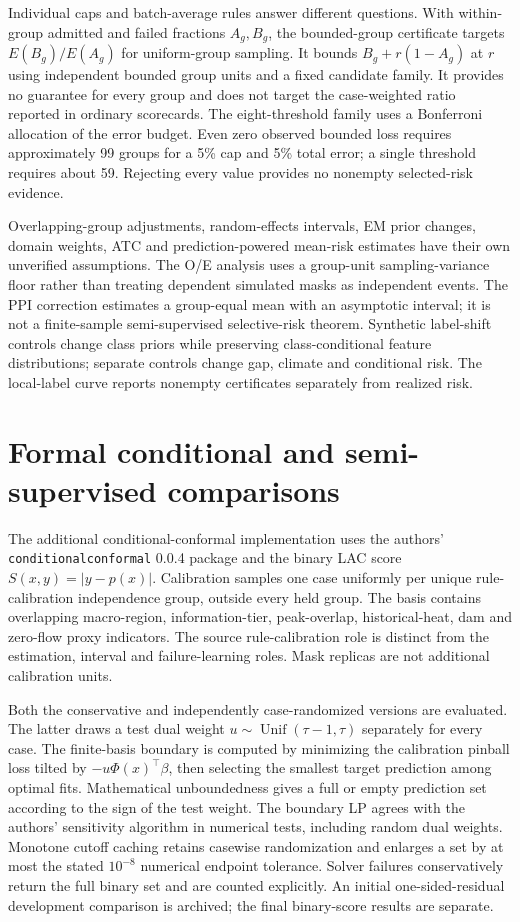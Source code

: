 \documentclass[draft]{agujournal2025}
\begin{document}
Individual caps and batch-average rules answer different questions. With within-group admitted and failed fractions $A_g,B_g$, the bounded-group certificate targets $E(B_g)/E(A_g)$ for uniform-group sampling. It bounds $B_g+r(1-A_g)$ at $r$ using independent bounded group units and a fixed candidate family. It provides no guarantee for every group and does not target the case-weighted ratio reported in ordinary scorecards. The eight-threshold family uses a Bonferroni allocation of the error budget. Even zero observed bounded loss requires approximately 99 groups for a 5\% cap and 5\% total error; a single threshold requires about 59. Rejecting every value provides no nonempty selected-risk evidence.

Overlapping-group adjustments, random-effects intervals, EM prior changes, domain weights, ATC and prediction-powered mean-risk estimates have their own unverified assumptions. The O/E analysis uses a group-unit sampling-variance floor rather than treating dependent simulated masks as independent events. The PPI correction estimates a group-equal mean with an asymptotic interval; it is not a finite-sample semi-supervised selective-risk theorem. Synthetic label-shift controls change class priors while preserving class-conditional feature distributions; separate controls change gap, climate and conditional risk. The local-label curve reports nonempty certificates separately from realized risk.

\section{Formal conditional and semi-supervised comparisons}
The additional conditional-conformal implementation uses the authors' \texttt{conditionalconformal} 0.0.4 package and the binary LAC score $S(x,y)=|y-p(x)|$. Calibration samples one case uniformly per unique rule-calibration independence group, outside every held group. The basis contains overlapping macro-region, information-tier, peak-overlap, historical-heat, dam and zero-flow proxy indicators. The source rule-calibration role is distinct from the estimation, interval and failure-learning roles. Mask replicas are not additional calibration units.

Both the conservative and independently case-randomized versions are evaluated. The latter draws a test dual weight $u\sim\operatorname{Unif}(\tau-1,\tau)$ separately for every case. The finite-basis boundary is computed by minimizing the calibration pinball loss tilted by $-u\Phi(x)^\top\beta$, then selecting the smallest target prediction among optimal fits. Mathematical unboundedness gives a full or empty prediction set according to the sign of the test weight. The boundary LP agrees with the authors' sensitivity algorithm in numerical tests, including random dual weights. Monotone cutoff caching retains casewise randomization and enlarges a set by at most the stated $10^{-8}$ numerical endpoint tolerance. Solver failures conservatively return the full binary set and are counted explicitly. An initial one-sided-residual development comparison is archived; the final binary-score results are separate.
\end{document}
